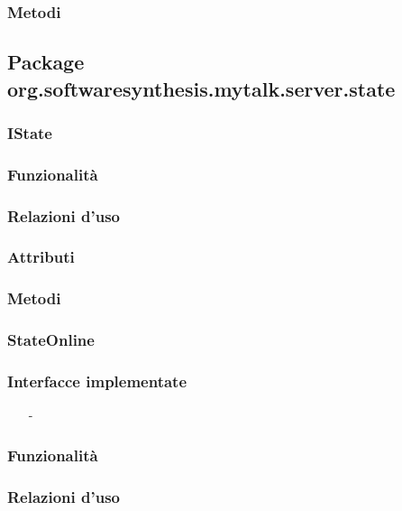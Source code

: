 \subsubsection*{Metodi}

\subsection{Package org.softwaresynthesis.mytalk.server.state}\label{sec:state}

\subsubsection{IState}\label{sec:istate}

\subsubsection*{Funzionalità}

\subsubsection*{Relazioni d'uso}

\subsubsection*{Attributi}

\subsubsection*{Metodi}

\subsubsection{StateOnline}\label{sec:stateonline}

\subsubsection*{Interfacce implementate}
\begin{itemize}[noitemsep,nolistsep]
  \item[-]
\end{itemize}

\subsubsection*{Funzionalità}

\subsubsection*{Relazioni d'uso}


